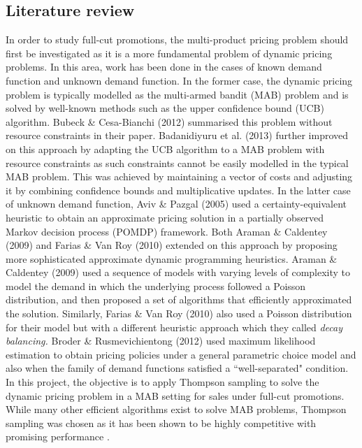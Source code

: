 \documentclass[a4paper]{article}
\begin{document}
\subsection{Literature review}
In order to study full-cut promotions, the multi-product pricing problem should first be investigated as it is a more fundamental problem of dynamic pricing problems. In this area, work has been done in the cases of known demand function and unknown demand function. In the former case, the dynamic pricing problem is typically modelled as the multi-armed bandit (MAB) problem and is solved by well-known methods such as the upper confidence bound (UCB) algorithm. Bubeck \& Cesa-Bianchi (2012) summarised this problem without resource constraints in their paper. Badanidiyuru et al. (2013) further improved on this approach by adapting the UCB algorithm to a MAB problem with resource constraints as such constraints cannot be easily modelled in the typical MAB problem. This was achieved by maintaining a vector of costs and adjusting it by combining confidence bounds and multiplicative updates. 
\newline
\newline
In the latter case of unknown demand function, Aviv \& Pazgal (2005) used a certainty-equivalent heuristic to obtain an approximate pricing solution in a partially observed Markov decision process (POMDP) framework. Both Araman \& Caldentey (2009) and Farias \& Van Roy (2010) extended on this approach by proposing more sophisticated approximate dynamic programming heuristics. Araman \& Caldentey (2009) used a sequence of models with varying levels of complexity to model the demand in which the underlying process followed a Poisson distribution, and then proposed a set of algorithms that efficiently approximated the solution. Similarly, Farias \& Van Roy (2010) also used a Poisson distribution for their model but with a different heuristic approach which they called \textit{decay balancing.} Broder \& Rusmevichientong (2012) used maximum likelihood estimation to obtain pricing policies under a general parametric choice model and also when the family of demand functions satisfied a ``well-separated" condition. 
\newline
\newline
In this project, the objective is to apply Thompson sampling to solve the dynamic pricing problem in a MAB setting for sales under full-cut promotions. While many other efficient algorithms exist to solve MAB problems, Thompson sampling was chosen as it has been shown to be highly competitive with promising performance \cite{thomp}. 
\end{document}

